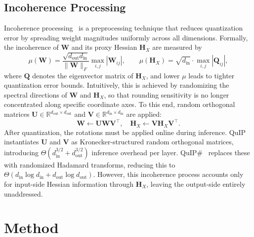 \documentclass{article} %
\begin{document}
\subsection{Incoherence Processing}
\label{sec:bg:incoherence}
Incoherence processing~\citep{chee2023quip} is a preprocessing technique that reduces quantization error by spreading weight magnitudes uniformly across all dimensions. Formally, the incoherence of $\mathbf{W}$ and its proxy Hessian $\mathbf{H}_X$ are measured by
\begin{equation}
    \mu(\mathbf{W}) = \frac{\sqrt{d_{\mathrm{out}} d_{\mathrm{in}}}}{\|\mathbf{W}\|_F}
    \max_{i,j} |\textbf{W}_{ij}|,
    \qquad
    \mu(\mathbf{H}_X) = \sqrt{d_{\mathrm{in}}} \cdot \max_{i,j} |\textbf{Q}_{ij}|,
    \label{eq:incoherence_measure}
\end{equation}
where $\mathbf{Q}$ denotes the eigenvector matrix of $\mathbf{H}_X$, and lower $\mu$ leads to tighter quantization error bounds. Intuitively, this is achieved by randomizing the spectral directions of $\mathbf{W}$ and $\mathbf{H}_X$, so that rounding sensitivity is no longer concentrated along specific coordinate axes. To this end, random orthogonal matrices $\mathbf{U} \in \mathbb{R}^{d_{\mathrm{out}} \times d_{\mathrm{out}}}$ and $\mathbf{V} \in \mathbb{R}^{d_{\mathrm{in}} \times d_{\mathrm{in}}}$ are applied:
\begin{equation}
    \mathbf{W} \leftarrow \mathbf{U}\mathbf{W}\mathbf{V}^\top,
    \quad \mathbf{H}_X \leftarrow \mathbf{V} \mathbf{H}_X \mathbf{V}^\top.
    \label{eq:incoherence}
\end{equation}
After quantization, the rotations must be applied online during inference. QuIP~\citep{chee2023quip} instantiates $\mathbf{U}$ and $\mathbf{V}$ as Kronecker-structured random orthogonal matrices, introducing $\Theta(d_{\mathrm{in}}^{3/2} + d_{\mathrm{out}}^{3/2})$ inference overhead per layer. QuIP\#~\citep{tseng2024quip} replaces these with randomized Hadamard transforms, reducing this to $\Theta(d_{\mathrm{in}} \log d_{\mathrm{in}} +  d_{\mathrm{out}} \log d_{\mathrm{out}})$. However, this incoherence process accounts only for input-side Hessian information through $\mathbf{H}_X$, leaving the output-side entirely unaddressed.
\vspace{-2mm}
\section{Method}
\label{sec:method}
\end{document}
